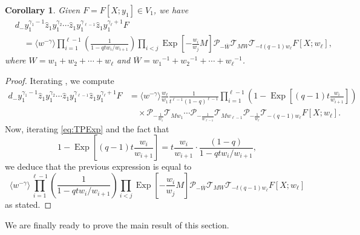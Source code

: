 \documentclass[reqno]{amsart}
\theoremstyle{plain}
\newtheorem{corollary}[theorem]{Corollary}
\theoremstyle{definition}
\theoremstyle{remark}
\DeclareMathOperator{\Exp}{Exp}
\newcommand{\z}{\widehat{z}}
\newcommand{\<}{\langle}
\renewcommand{\>}{\rangle}
\begin{document}
\begin{corollary}
    \label{cor:Dgamma1plethystic}
    Given $F = F[X;y_1]\in V_1$, we have
    \begin{align*}
        & d_- y_1^{\gamma_{1}-1} \z_1 y_1^{\gamma_{2}} \cdots \z_1 y_1^{\gamma_{\ell-1}} \z_1 y_1^{\gamma_{\ell}+1} F \\
        & \quad = \langle w^{-\gamma} \rangle \prod_{i=1}^{\ell-1}\left(\frac{1}{1-qtw_{i}/w_{i+1}}\right) \prod_{i<j} \Exp\left[-\frac{w_{i}}{w_j} M\right] \mathcal{P}_{-\overline{W}} \mathcal{T}_{MW} \mathcal{T}_{-t(q-1)w_\ell}F[X;w_\ell],
    \end{align*}
    where $ W = w_1+w_2+\cdots +w_{\ell}$ and $\overline{W} = {w_1}^{-1}+{w_2}^{-1}+\cdots +{w_\ell}^{-1}$.
\end{corollary}

\begin{proof}
    Iterating , we compute
    \begin{align*}
        d_- y_1^{\gamma_{1}-1} \z_1 y_1^{\gamma_{2}} \cdots \z_1 y_1^{\gamma_{\ell-1}} \z_1 y_1^{\gamma_{\ell}+1} F & = \langle w^{-\gamma} \rangle \frac{w_\ell}{w_1} \frac{1}{t^{\ell-1}(1-q)^{\ell-1}}\prod_{i=1}^{\ell-1} \left(1-\Exp\left[(q-1)t \frac{w_{i}}{w_{i+1}} \right] \right)
        \\
        & \quad \times
        \mathcal{P}_{-\frac{1}{w_1}} \mathcal{T}_{Mw_1} \cdots \mathcal{P}_{-\frac{1}{w_{\ell-1}}} \mathcal{T}_{Mw_{\ell-1}}\mathcal{P}_{-\frac{1}{w_\ell}} \mathcal{T}_{-(q-1)w_\ell}F[X;w_\ell].
    \end{align*}
    Now, iterating \eqref{eq:TPExp} and the fact that
    \[1-\Exp\left[(q-1)t\frac{w_i}{w_{i+1}}\right]=t\frac{w_i}{w_{i+1}}\cdot \frac{(1-q)}{1-qtw_i/w_{i+1}}, \]
    we deduce that the previous expression is equal to
    \[
        \langle w^{-\gamma} \rangle \prod_{i=1}^{\ell-1}\left(\frac{1}{1-qtw_{i}/w_{i+1}}\right) \prod_{i<j} \Exp\left[-\frac{w_{i}}{w_j} M\right] \mathcal{P}_{-\overline{W}} \mathcal{T}_{MW} \mathcal{T}_{-t(q-1)w_\ell} F[X;w_\ell]
    \]
    as stated.
\end{proof}

We are finally ready to prove the main result of this section.
\end{document}
